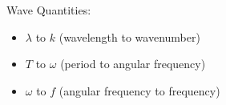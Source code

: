 

\vspace*{\fill}
\centering

Wave Quantities:
\begin{itemize}
    \item $\lambda$ to $k$ (wavelength to wavenumber)
    \item $T$ to $\omega$ (period to angular frequency)
    \item $\omega$ to $f$ (angular frequency to frequency)
\end{itemize}

\centering
\vspace*{\fill}

